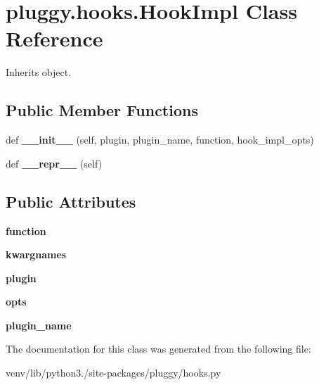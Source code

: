 \hypertarget{classpluggy_1_1hooks_1_1_hook_impl}{}\section{pluggy.\+hooks.\+Hook\+Impl Class Reference}
\label{classpluggy_1_1hooks_1_1_hook_impl}


Inherits object.

\subsection*{Public Member Functions}
\begin{DoxyCompactItemize}
\item 
\mbox{\label{classpluggy_1_1hooks_1_1_hook_impl_a4ba30c7e5acee86be382b6951fabeeb0}} 
def {\bfseries \+\_\+\+\_\+init\+\_\+\+\_\+} (self, plugin, plugin\+\_\+name, function, hook\+\_\+impl\+\_\+opts)
\item 
\mbox{\label{classpluggy_1_1hooks_1_1_hook_impl_a125ceeda10a657d48f651d31a3f344c2}} 
def {\bfseries \+\_\+\+\_\+repr\+\_\+\+\_\+} (self)
\end{DoxyCompactItemize}
\subsection*{Public Attributes}
\begin{DoxyCompactItemize}
\item 
\mbox{\label{classpluggy_1_1hooks_1_1_hook_impl_a2f05b6a7db845de8d4bcc1b844251c98}} 
{\bfseries function}
\item 
\mbox{\label{classpluggy_1_1hooks_1_1_hook_impl_a2e5ed245661d159dd643d601c0995302}} 
{\bfseries kwargnames}
\item 
\mbox{\label{classpluggy_1_1hooks_1_1_hook_impl_a5caf27072b3cbf510ec14492e67d0d9e}} 
{\bfseries plugin}
\item 
\mbox{\label{classpluggy_1_1hooks_1_1_hook_impl_a1f2a9744ff49d7930997011393314a90}} 
{\bfseries opts}
\item 
\mbox{\label{classpluggy_1_1hooks_1_1_hook_impl_a7deed37289ce07f7fdc3946e8efe6079}} 
{\bfseries plugin\+\_\+name}
\end{DoxyCompactItemize}


The documentation for this class was generated from the following file\+:\begin{DoxyCompactItemize}
\item 
venv/lib/python3./site-\/packages/pluggy/hooks.\+py\end{DoxyCompactItemize}
